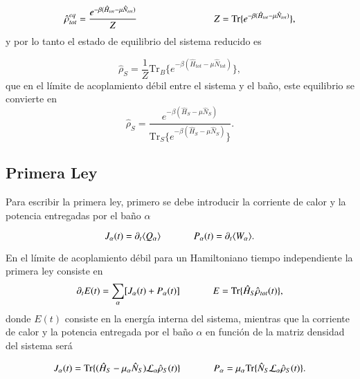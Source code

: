\begin{equation*}
    \hat{\rho}^{eq}_{tot} = \frac{e^{-\beta(\hat{H}_{tot} - \mu \hat{N}_{tot})}}{Z}  \hspace{28mm} Z = \text{Tr}\{e^{-\beta(\hat{H}_{tot} - \mu \hat{N}_{tot})} \},
\end{equation*}
y por lo tanto el estado de equilibrio del sistema reducido es

\begin{equation*}
    \hat{\rho}_{S} = \frac{1}{Z}\text{Tr}_{B}\{ e^{-\beta(\hat{H}_{tot} - \mu \hat{N}_{tot})} \},
\end{equation*}
que en el límite de acoplamiento débil entre el sistema y el baño, este equilibrio se convierte en \cite{geva2000second}
\begin{equation*}
    \hat{\rho}_{S} = \frac{e^{-\beta(\hat{H}_{S} - \mu\hat{N}_{S})}}{\text{Tr}_{S}\{e^{-\beta(\hat{H}_{S} - \mu \hat{N}_{S})} \} }.
\end{equation*}

\subsection{Primera Ley}
Para escribir la primera ley, primero se debe introducir la corriente de calor y la potencia entregadas por el baño $\alpha$

\begin{equation*}
    J_{\alpha}(t) = \partial_{t}\langle Q_{\alpha}\rangle \hspace{12mm}  P_{\alpha}(t) = \partial_{t}\langle W_{\alpha}\rangle.
\end{equation*}

En el límite de acoplamiento débil para un Hamiltoniano tiempo independiente la primera ley consiste en 
\begin{equation*}
    \partial_{t}E(t) = \sum_{\alpha}[J_{\alpha}(t) + P_{\alpha}(t) ] \hspace{12mm} E = \text{Tr}\{\hat{H}_{S}\hat{\rho}_{tot}(t) \},
\end{equation*}
donde $E(t)$ consiste en la energía interna del sistema, mientras que la corriente de calor y la potencia entregada por el baño $\alpha$ en función de la matriz densidad del sistema será 

\begin{equation*}
    J_{\alpha}(t) = \text{Tr}\{(\hat{H}_{S} - \mu_{\alpha}\hat{N}_S)\mathcal{L}_{\alpha}\hat{\rho}_{S}(t) \} \hspace{12mm} P_{\alpha} = \mu_{\alpha} \text{Tr}\{\hat{N}_{S}\mathcal{L}_{\alpha}\hat{\rho}_{S}(t) \}. 
\end{equation*}

